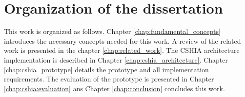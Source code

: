
\section{Organization of the dissertation}
\label{sec:organization_of_dissertation}
This work is organized as follows. Chapter \ref{chap:fundamental_concepts} introduces the necessary concepts  needed for this work. A review of the related work is presented in the chapter \ref{chap:related_work}.  The CSHIA architecture implementation is described in Chapter \ref{chap:cshia_architecture}. Chapter \ref{chap:cshia_prototype} details the prototype and all implementation requirements. The evaluation of the prototype is presented in Chapter \ref{chap:cshia:evaluation} ans Chapter \ref{chap:conclusion} concludes this work.


